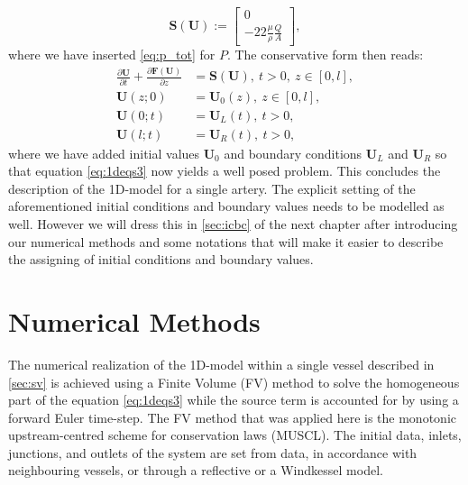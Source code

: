\documentclass[a4paper, oneside]{discothesis}
\begin{document}
\begin{equation}
	\mathbf{S} \left( \mathbf{U} \right) := 
	\begin{bmatrix}
		0 \\
	-22\frac{\mu}{\rho}\frac{Q}{A} 
	\end{bmatrix},
\end{equation}
where we have inserted \autoref{eq:p_tot} for $P$.
The conservative form then reads:
\begin{equation}
	\begin{aligned}
		\frac{\partial \mathbf{U}}{\partial t} + \frac{\partial \mathbf{F} \left( \mathbf{U} \right)}{\partial z} &= \mathbf{S} \left( \mathbf{U} \right), \ t>0, \ z \in \left[ 0,l \right], \\
		\mathbf{U} \left( z;0 \right) &= \mathbf{U}_0 \left( z \right), \ z \in \left[ 0,l \right], \\
		\mathbf{U} \left( 0;t \right) &= \mathbf{U}_L \left( t \right), \ t>0,\\
		\mathbf{U} \left( l;t \right) &= \mathbf{U}_R \left( t \right), \ t>0,
	\end{aligned} \label{eq:1deqs3}
\end{equation}
where we have added initial values $\mathbf{U}_0$ and boundary conditions $\mathbf{U}_L$ and $\mathbf{U}_R$ so that equation \ref{eq:1deqs3} now yields a well posed problem.\cite{formaggia2010cardiovascular}
This concludes the description of the 1D-model for a single artery.
The explicit setting of the aforementioned initial conditions and boundary values needs to be modelled as well.
However we will dress this in \autoref{sec:icbc} of the next chapter after introducing our numerical methods and some notations that will make it easier to describe the assigning of initial conditions and boundary values.





\chapter{Numerical Methods} \label{chap:nm}
The numerical realization of the 1D-model within a single vessel described in \autoref{sec:sv} is achieved using a Finite Volume (FV) method to solve the homogeneous part of the equation \autoref{eq:1deqs3} while the source term is accounted for by using a forward Euler time-step. 
The FV method that was applied here is the monotonic upstream-centred scheme for conservation laws (MUSCL).
The initial data, inlets, junctions, and outlets of the system are set from data, in accordance with neighbouring vessels, or through a reflective or a Windkessel model.
\end{document}
